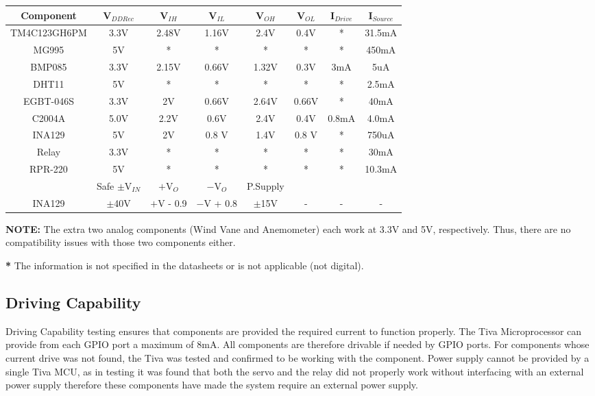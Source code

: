 	\begin{center}	
		\begin{tabular}{|c|c|c|c|c|c|c|c|}
			\hline
				\rowcolor{gray!50}\textbf{Component} & V$_{DD Rec}$ & V$_{IH}$ & V$_{IL}$ & V$_{OH}$ & V$_{OL}$ & I$_{Drive}$ & I$_{Source}$\\
			\hline
					TM4C123GH6PM & 3.3V & 2.48V & 1.16V & 2.4V & 0.4V & * & 31.5mA\\ %
					MG995 & 5V & * & * & * & * & * & 450mA\\ %
					BMP085 & 3.3V & 2.15V & 0.66V & 1.32V & 0.3V & 3mA & 5uA \\ %
					DHT11 & 5V & * & * & * & * & * & 2.5mA \\ %
					EGBT-046S & 3.3V & 2V & 0.66V  & 2.64V & 0.66V & * & 40mA \\ %
					C2004A & 5.0V & 2.2V & 0.6V & 2.4V & 0.4V & 0.8mA & 4.0mA \\ %
					INA129 & 5V & 2V & 0.8 V & 1.4V & 0.8 V & * & 750uA\\ %
					Relay & 3.3V & * & * & * & * & * & 30mA\\  %
					RPR-220 & 5V & * & * & * & * & * & 10.3mA\\  %
			\hline
				\rowcolor{gray!50} & Safe $\pm$V$_{IN}$ & $+$V$_{O}$& $-$V$_{O}$& P.Supply& & &\\
			\hline
					INA129 & $\pm$40V & $+$V - 0.9 & $-$V + 0.8 & $\pm$15V & - & - & -\\
			\hline
		\end{tabular}
	\end{center}
	
			
	
	\textbf{NOTE:} The extra two analog components (Wind Vane and Anemometer) each work at 3.3V and 5V, respectively. Thus, there are no compatibility issues with those two components either.
	
	\textbf{*} The information is not specified in the datasheets or is not applicable (not digital).

	\subsection{Driving Capability}
	
	Driving Capability testing ensures that components are provided the required current to function properly. The Tiva Microprocessor can provide from each GPIO port a maximum of 8mA. All components are therefore drivable if needed by GPIO ports. For components whose current drive was not found, the Tiva was tested and confirmed to be working with the component. Power supply cannot be provided by a single Tiva MCU, as in testing it was found that both the servo and the relay did not properly work without interfacing with an external power supply therefore these components have made the system require an external power supply.
			
